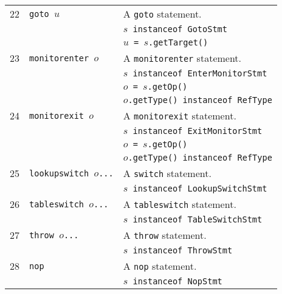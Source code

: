 \documentclass{article}
\begin{document}
\begin{scriptsize}
\begin{tabular}{lll}
\hline
22 & \texttt{goto $u$}    & A \texttt{goto} statement.\\
&                & \texttt{$s$ instanceof GotoStmt}\\
&                & \texttt{$u$ = $s$.getTarget()}\\
\hline
23 & \texttt{monitorenter $o$}    & A \texttt{monitorenter} statement.\\
&                & \texttt{$s$ instanceof EnterMonitorStmt}\\
&                & \texttt{$o$ = $s$.getOp()}\\
&                & \texttt{$o$.getType() instanceof RefType}\\
\hline
24 & \texttt{monitorexit $o$}    & A \texttt{monitorexit} statement.\\
&                & \texttt{$s$ instanceof ExitMonitorStmt}\\
&                & \texttt{$o$ = $s$.getOp()}\\
&                & \texttt{$o$.getType() instanceof RefType}\\
\hline
25 & \texttt{lookupswitch $o$...}    & A \texttt{switch} statement.\\
&                & \texttt{$s$ instanceof LookupSwitchStmt}\\
\hline
26 & \texttt{tableswitch $o$...}    & A \texttt{tableswitch} statement.\\
&                & \texttt{$s$ instanceof TableSwitchStmt}\\
\hline
27 & \texttt{throw $o$...}    & A \texttt{throw} statement.\\
&                & \texttt{$s$ instanceof ThrowStmt}\\
\hline
28 & \texttt{nop}    & A \texttt{nop} statement.\\
&                & \texttt{$s$ instanceof NopStmt}\\
\hline
\end{tabular}
\end{scriptsize}
\end{document}
